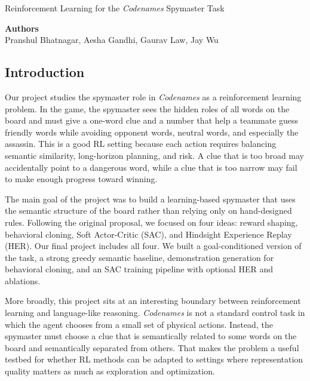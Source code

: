 \documentclass[9pt]{article}
\begin{document}
\begin{center}
{\LARGE Reinforcement Learning for the \emph{Codenames} Spymaster Task \par}
\vspace{0.75em}
\end{center}

\vspace{1em}

\textbf{Authors} \\
Pranshul Bhatnagar, Aesha Gandhi, Gaurav Law, Jay Wu

\vspace{0.5em}

\subsection{Introduction}\label{introduction}

Our project studies the spymaster role in \emph{Codenames} as a
reinforcement learning problem. In the game, the spymaster sees the
hidden roles of all words on the board and must give a one-word clue and
a number that help a teammate guess friendly words while avoiding
opponent words, neutral words, and especially the assassin. This is a
good RL setting because each action requires balancing semantic
similarity, long-horizon planning, and risk. A clue that is too broad
may accidentally point to a dangerous word, while a clue that is too
narrow may fail to make enough progress toward winning.

The main goal of the project was to build a learning-based spymaster
that uses the semantic structure of the board rather than relying only
on hand-designed rules. Following the original proposal, we focused on
four ideas: reward shaping, behavioral cloning, Soft Actor-Critic (SAC),
and Hindsight Experience Replay (HER). Our final project includes all
four. We built a goal-conditioned version of the task, a strong greedy
semantic baseline, demonstration generation for behavioral cloning, and
an SAC training pipeline with optional HER and ablations.

More broadly, this project sits at an interesting boundary between
reinforcement learning and language-like reasoning. \emph{Codenames} is not a
standard control task in which the agent chooses from a small set of
physical actions. Instead, the spymaster must choose a clue that is
semantically related to some words on the board and semantically
separated from others. That makes the problem a useful testbed for
whether RL methods can be adapted to settings where
representation quality matters as much as exploration and optimization.
\end{document}
